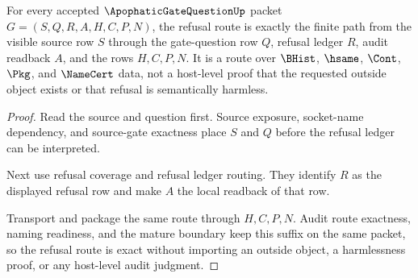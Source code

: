 \begin{theorem}
\label{thm:apophatic-gate-question-root-refusal-route-exactness}
For every accepted $\ApophaticGateQuestionUp$ packet $G=(S,Q,R,A,H,C,P,N)$, the refusal route is exactly the finite path from the visible source row $S$ through the gate-question row $Q$, refusal ledger $R$, audit readback $A$, and the rows $H,C,P,N$. It is a route over $\BHist$, $\hsame$, $\Cont$, $\Pkg$, and $\NameCert$ data, not a host-level proof that the requested outside object exists or that refusal is semantically harmless.
\end{theorem}
\begin{proof}
Read the source and question first. Source exposure, socket-name dependency, and source-gate exactness place $S$ and $Q$ before the refusal ledger can be interpreted.

Next use refusal coverage and refusal ledger routing. They identify $R$ as the displayed refusal row and make $A$ the local readback of that row.

Transport and package the same route through $H,C,P,N$. Audit route exactness, naming readiness, and the mature boundary keep this suffix on the same packet, so the refusal route is exact without importing an outside object, a harmlessness proof, or any host-level audit judgment.
\end{proof}

